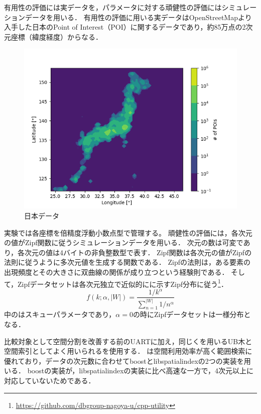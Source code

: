 有用性の評価には実データを，パラメータに対する頑健性の評価にはシミュレーションデータを用いる．
有用性の評価に用いる実データはOpenStreetMapより入手した日本のPoint of Interest（POI）に関するデータであり，約85万点の2次元座標（緯度経度）からなる．
\Fig{\ref{fig:japan}}
\begin{figure}[tb]
  \centering
  \includegraphics[scale=0.4]{./figures/japan-poi.png}
  \caption{日本データ}
  \label{fig:japan}
\end{figure}
実験では各座標を倍精度浮動小数点型で管理する。
頑健性の評価には，各次元の値がZipf関数に従うシミュレーションデータを用いる．
次元の数は可変であり，各次元の値は4バイトの非負整数型で表す．
Zipf関数は各次元の値がZipfの法則に従うように多次元値を生成する関数である．
Zipfの法則は，ある要素の出現頻度とその大きさに双曲線の関係が成り立つという経験則である．
そして，Zipfデータセットは各次元独立で近似的に\Eq{\ref{eq:zipf}}に示すZipf分布に従う\footnote{\footnotesize\url{https://github.com/dbgroup-nagoya-u/cpp-utility}}．
\begin{equation}
  \label{eq:zipf}
  f(k; \alpha, |W|) = \frac{1 / k^{\alpha}}{\sum_{n = 1}^{|W|} 1 / n^{\alpha}}
\end{equation}
\Eq{\ref{eq:zipf}}中の\alpha はスキューパラメータであり，$\alpha = 0$の時にZipfデータセットは一様分布となる．

比較対象として空間分割を改善する前のUARTに加え，同じく\ZCurve を用いるUB木と空間索引としてよく用いられる\RTree を使用する．
\RTree は空間利用効率が高く範囲検索に優れており，データの次元数に合わせてboostとlibspatialindexの2つの実装を用いる．
boostの実装が，libspatialindexの実装に比べ高速な一方で，4次元以上に対応していないためである．

